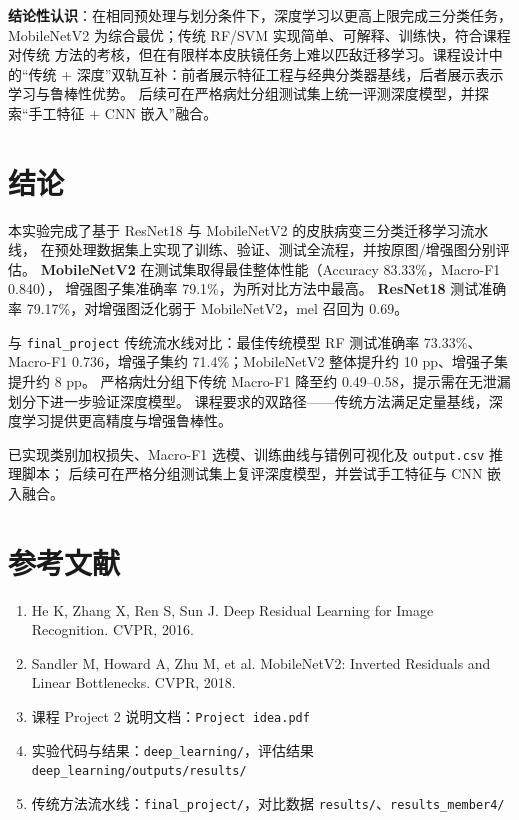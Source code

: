 \documentclass[12pt,a4paper]{ctexart}
\begin{document}
\textbf{结论性认识}：在相同预处理与划分条件下，深度学习以更高上限完成三分类任务，
MobileNetV2 为综合最优；传统 RF/SVM 实现简单、可解释、训练快，符合课程对传统
方法的考核，但在有限样本皮肤镜任务上难以匹敌迁移学习。课程设计中的“传统 +
深度”双轨互补：前者展示特征工程与经典分类器基线，后者展示表示学习与鲁棒性优势。
后续可在严格病灶分组测试集上统一评测深度模型，并探索“手工特征 + CNN 嵌入”融合。

\section{结论}

本实验完成了基于 ResNet18 与 MobileNetV2 的皮肤病变三分类迁移学习流水线，
在预处理数据集上实现了训练、验证、测试全流程，并按原图/增强图分别评估。
\textbf{MobileNetV2} 在测试集取得最佳整体性能（Accuracy 83.33\%，Macro-F1 0.840），
增强图子集准确率 79.1\%，为所对比方法中最高。
\textbf{ResNet18} 测试准确率 79.17\%，对增强图泛化弱于 MobileNetV2，mel 召回为 0.69。

与 \texttt{final\_project} 传统流水线对比：最佳传统模型 RF 测试准确率 73.33\%、
Macro-F1 0.736，增强子集约 71.4\%；MobileNetV2 整体提升约 10 pp、增强子集提升约 8 pp。
严格病灶分组下传统 Macro-F1 降至约 0.49--0.58，提示需在无泄漏划分下进一步验证深度模型。
课程要求的双路径——传统方法满足定量基线，深度学习提供更高精度与增强鲁棒性。

已实现类别加权损失、Macro-F1 选模、训练曲线与错例可视化及 \texttt{output.csv} 推理脚本；
后续可在严格分组测试集上复评深度模型，并尝试手工特征与 CNN 嵌入融合。

\section*{参考文献}
\begin{enumerate}
  \item He K, Zhang X, Ren S, Sun J. Deep Residual Learning for Image Recognition. CVPR, 2016.
  \item Sandler M, Howard A, Zhu M, et al. MobileNetV2: Inverted Residuals and Linear Bottlenecks. CVPR, 2018.
  \item 课程 Project 2 说明文档：\texttt{Project idea.pdf}
  \item 实验代码与结果：\texttt{deep\_learning/}，评估结果 \texttt{deep\_learning/outputs/results/}
  \item 传统方法流水线：\texttt{final\_project/}，对比数据 \texttt{results/}、\texttt{results\_member4/}
\end{enumerate}
\end{document}
